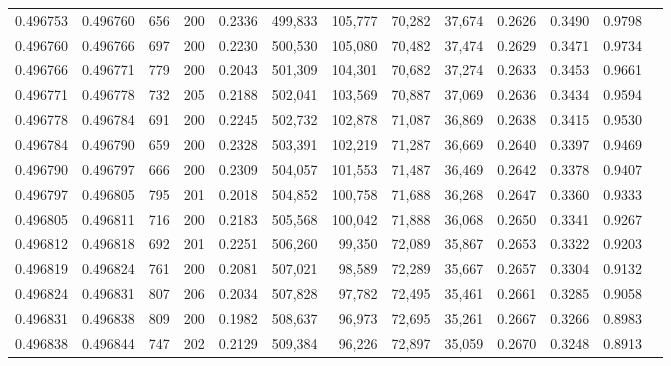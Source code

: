 \begin{tabular}{rrrrrrrrrrrrr}
0.496753 & 0.496760 &   656 & 200 &                                     0.2336 & 499,833 & 105,777 &  70,282 &  37,674 & 0.2626 & 0.3490 & 0.9798 \\
0.496760 & 0.496766 &   697 & 200 &                                     0.2230 & 500,530 & 105,080 &  70,482 &  37,474 & 0.2629 & 0.3471 & 0.9734 \\
0.496766 & 0.496771 &   779 & 200 &                                     0.2043 & 501,309 & 104,301 &  70,682 &  37,274 & 0.2633 & 0.3453 & 0.9661 \\
0.496771 & 0.496778 &   732 & 205 &                                     0.2188 & 502,041 & 103,569 &  70,887 &  37,069 & 0.2636 & 0.3434 & 0.9594 \\
0.496778 & 0.496784 &   691 & 200 &                                     0.2245 & 502,732 & 102,878 &  71,087 &  36,869 & 0.2638 & 0.3415 & 0.9530 \\
0.496784 & 0.496790 &   659 & 200 &                                     0.2328 & 503,391 & 102,219 &  71,287 &  36,669 & 0.2640 & 0.3397 & 0.9469 \\
0.496790 & 0.496797 &   666 & 200 &                                     0.2309 & 504,057 & 101,553 &  71,487 &  36,469 & 0.2642 & 0.3378 & 0.9407 \\
0.496797 & 0.496805 &   795 & 201 &                                     0.2018 & 504,852 & 100,758 &  71,688 &  36,268 & 0.2647 & 0.3360 & 0.9333 \\
0.496805 & 0.496811 &   716 & 200 &                                     0.2183 & 505,568 & 100,042 &  71,888 &  36,068 & 0.2650 & 0.3341 & 0.9267 \\
0.496812 & 0.496818 &   692 & 201 &                                     0.2251 & 506,260 &  99,350 &  72,089 &  35,867 & 0.2653 & 0.3322 & 0.9203 \\
0.496819 & 0.496824 &   761 & 200 &                                     0.2081 & 507,021 &  98,589 &  72,289 &  35,667 & 0.2657 & 0.3304 & 0.9132 \\
0.496824 & 0.496831 &   807 & 206 &                                     0.2034 & 507,828 &  97,782 &  72,495 &  35,461 & 0.2661 & 0.3285 & 0.9058 \\
0.496831 & 0.496838 &   809 & 200 &                                     0.1982 & 508,637 &  96,973 &  72,695 &  35,261 & 0.2667 & 0.3266 & 0.8983 \\
0.496838 & 0.496844 &   747 & 202 &                                     0.2129 & 509,384 &  96,226 &  72,897 &  35,059 & 0.2670 & 0.3248 & 0.8913 \\

\end{tabular}
